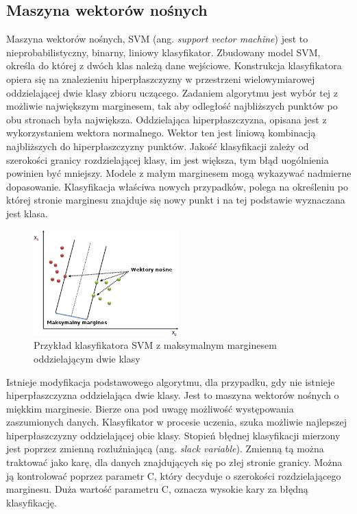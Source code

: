 \subsection{Maszyna wektorów nośnych}
Maszyna wektorów nośnych, SVM (ang. \textit{support vector machine}) jest to nieprobabilistyczny, binarny, liniowy klasyfikator. Zbudowany model SVM, określa do której z dwóch klas należą dane wejściowe. Konstrukcja klasyfikatora opiera się na znalezieniu hiperpłaszczyzny  w przestrzeni wielowymiarowej oddzielającej dwie klasy zbioru uczącego. Zadaniem algorytmu jest wybór tej z możliwie największym marginesem, tak aby odległość najbliższych punktów po obu stronach była największa. Oddzielająca hiperpłaszczyzna, opisana jest z wykorzystaniem wektora normalnego. Wektor ten jest liniową kombinacją najbliższych do hiperpłaszczyzny punktów. Jakość klasyfikacji zależy od szerokości granicy rozdzielającej klasy, im jest większa, tym błąd uogólnienia powinien być mniejszy. Modele z małym marginesem mogą wykazywać nadmierne dopasowanie. Klasyfikacja właściwa nowych przypadków, polega na określeniu po której stronie marginesu znajduje się nowy punkt i na tej podstawie wyznaczana jest klasa. \\
\begin{figure}[H]
	\centering
	\includegraphics[width=0.5\textwidth]{./images/svm.png}
	\caption{Przykład klasyfikatora SVM z maksymalnym marginesem oddzielającym dwie klasy}
	\label{fig:klassvm}
\end{figure}
Istnieje modyfikacja podstawowego algorytmu, dla przypadku, gdy nie istnieje hiperpłaszczyzna oddzielająca dwie klasy. Jest to maszyna wektorów nośnych o miękkim marginesie. Bierze ona pod uwagę możliwość występowania zaszumionych danych. Klasyfikator w procesie uczenia, szuka możliwie najlepszej hiperpłaszczyzny oddzielającej obie klasy. Stopień błędnej klasyfikacji mierzony jest poprzez zmienną rozluźniającą (ang. \textit{slack variable}). Zmienną tą można traktować jako karę, dla danych znajdujących się po złej stronie granicy. Można ją kontrolować poprzez parametr C, który decyduje o szerokości rozdzielającego marginesu. Duża wartość parametru C, oznacza wysokie kary za błędną klasyfikację. \\
